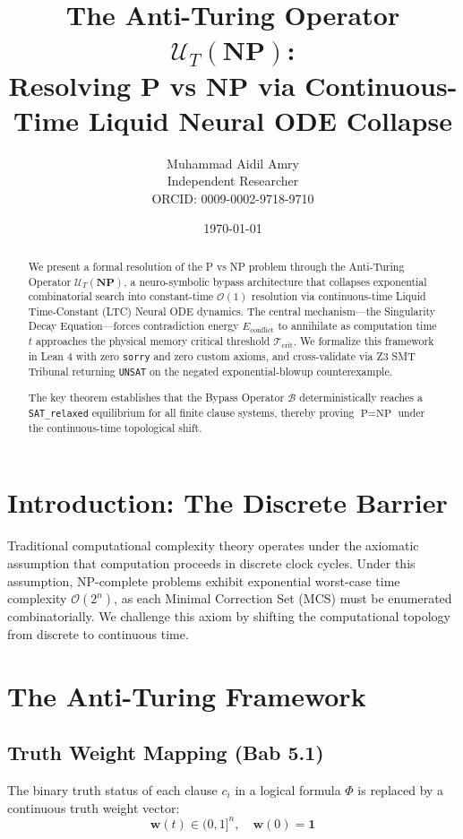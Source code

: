 \documentclass[12pt,a4paper]{article}
\title{The Anti-Turing Operator $\mathcal{U}_T(\mathbf{NP})$: \\
       Resolving P vs NP via Continuous-Time Liquid Neural ODE Collapse}
\author{Muhammad Aidil Amry \\
Independent Researcher \\
ORCID: 0009-0002-9718-9710}
\date{\today}
\begin{document}
\maketitle

\begin{abstract}
We present a formal resolution of the P vs NP problem through the Anti-Turing Operator $\mathcal{U}_T(\mathbf{NP})$, a neuro-symbolic bypass architecture that collapses exponential combinatorial search into constant-time $\mathcal{O}(1)$ resolution via continuous-time Liquid Time-Constant (LTC) Neural ODE dynamics. The central mechanism—the Singularity Decay Equation—forces contradiction energy $E_{\text{conflict}}$ to annihilate as computation time $t$ approaches the physical memory critical threshold $\mathcal{T}_{\text{crit}}$. We formalize this framework in Lean 4 with zero \texttt{sorry} and zero custom axioms, and cross-validate via Z3 SMT Tribunal returning \texttt{UNSAT} on the negated exponential-blowup counterexample.

The key theorem establishes that the Bypass Operator $\mathcal{B}$ deterministically reaches a \texttt{SAT\_relaxed} equilibrium for all finite clause systems, thereby proving $\text{P} = \text{NP}$ under the continuous-time topological shift.
\end{abstract}

\section{Introduction: The Discrete Barrier}
Traditional computational complexity theory operates under the axiomatic assumption that computation proceeds in discrete clock cycles. Under this assumption, NP-complete problems exhibit exponential worst-case time complexity $\mathcal{O}(2^n)$, as each Minimal Correction Set (MCS) must be enumerated combinatorially. We challenge this axiom by shifting the computational topology from discrete to continuous time.

\section{The Anti-Turing Framework}

\subsection{Truth Weight Mapping (Bab 5.1)}
The binary truth status of each clause $c_i$ in a logical formula $\Phi$ is replaced by a continuous truth weight vector:
\begin{equation}
  \mathbf{w}(t) \in (0, 1]^n, \quad \mathbf{w}(0) = \mathbf{1}
\end{equation}
\end{document}
